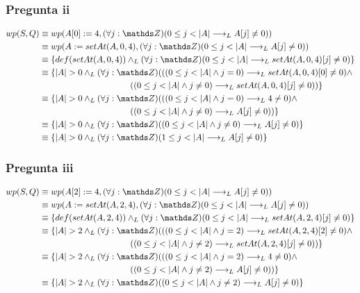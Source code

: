 \subsubsection{Pregunta ii}
\begin{align*}
    wp(S, Q) &\equiv wp(A[0] := 4, (\forall j: \ent)(0 \leq j < |A| \implicaLuego A[j] \neq 0)) \\
    &\equiv wp(A := setAt(A, 0, 4), (\forall j: \ent)(0 \leq j < |A| \implicaLuego A[j] \neq 0)) \\
    &\equiv \{ def(setAt(A, 0, 4)) \yLuego (\forall j: \ent)(0 \leq j < |A| \implicaLuego setAt(A, 0, 4)[j] \neq 0) \} \\
    &\equiv \{ |A| > 0 \yLuego (\forall j: \ent)(((0 \leq j < |A| \wedge j = 0) \implicaLuego setAt(A, 0, 4)[0] \neq 0) \wedge \\
    &\qquad \qquad \qquad \qquad \qquad \; \: ((0 \leq j < |A| \wedge j \neq 0) \implicaLuego setAt(A, 0, 4)[j] \neq 0)) \} \\
    &\equiv \{ |A| > 0 \yLuego (\forall j: \ent)(((0 \leq j < |A| \wedge j = 0) \implicaLuego 4 \neq 0) \wedge \\
    &\qquad \qquad \qquad \qquad \qquad \; \: ((0 \leq j < |A| \wedge j \neq 0) \implicaLuego A[j] \neq 0)) \} \\
    &\equiv \{ |A| > 0 \yLuego (\forall j: \ent)((0 \leq j < |A| \wedge j \neq 0) \implicaLuego A[j] \neq 0) \} \\
    &\equiv \{ |A| > 0 \yLuego (\forall j: \ent)(1 \leq j < |A| \implicaLuego A[j] \neq 0) \} \\
\end{align*}

\subsubsection{Pregunta iii}
\begin{align*}
    wp(S, Q) &\equiv wp(A[2] := 4, (\forall j: \ent)(0 \leq j < |A| \implicaLuego A[j] \neq 0)) \\
    &\equiv wp(A := setAt(A, 2, 4), (\forall j: \ent)(0 \leq j < |A| \implicaLuego A[j] \neq 0)) \\
    &\equiv \{ def(setAt(A, 2, 4)) \yLuego (\forall j: \ent)(0 \leq j < |A| \implicaLuego setAt(A, 2, 4)[j] \neq 0) \} \\
    &\equiv \{ |A| > 2 \yLuego (\forall j: \ent)(((0 \leq j < |A| \wedge j = 2) \implicaLuego setAt(A, 2, 4)[2] \neq 0) \wedge \\ 
    &\qquad \qquad \qquad \qquad \qquad \; \: ((0 \leq j < |A| \wedge j \neq 2) \implicaLuego setAt(A, 2, 4)[j] \neq 0)) \} \\
    &\equiv \{ |A| > 2 \yLuego (\forall j: \ent)(((0 \leq j < |A| \wedge j = 2) \implicaLuego 4 \neq 0) \wedge \\ 
    &\qquad \qquad \qquad \qquad \qquad \; \: ((0 \leq j < |A| \wedge j \neq 2) \implicaLuego A[j] \neq 0)) \} \\
    &\equiv \{ |A| > 2 \yLuego (\forall j: \ent)((0 \leq j < |A| \wedge j \neq 2) \implicaLuego A[j] \neq 0) \} \\
\end{align*}

